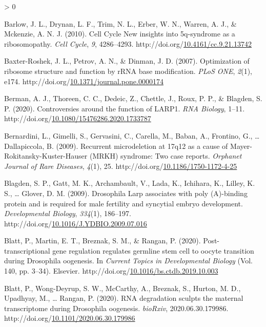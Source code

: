 \documentclass[12pt,oneside]{reedthesis}
\newlength{\cslhangindent}
\newenvironment{CSLReferences}[2] %
 {%
  \setlength{\parindent}{0pt}
  \ifodd #1 \everypar{\setlength{\hangindent}{\cslhangindent}}\ignorespaces\fi
  \ifnum #2 > 0
  \setlength{\parskip}{#2\baselineskip}
  \fi
 }%
 {}
\begin{document}
\begin{CSLReferences}{1}{0}
\leavevmode\hypertarget{ref-Barlow2010a}{}%
Barlow, J. L., Drynan, L. F., Trim, N. L., Erber, W. N., Warren, A. J., \& Mckenzie, A. N. J. (2010). Cell {Cycle New} insights into 5q-syndrome as a ribosomopathy. \emph{Cell Cycle}, \emph{9}, 4286--4293. http://doi.org/\href{https://doi.org/10.4161/cc.9.21.13742}{10.4161/cc.9.21.13742}

\leavevmode\hypertarget{ref-Baxter-Roshek2007f}{}%
Baxter-Roshek, J. L., Petrov, A. N., \& Dinman, J. D. (2007). Optimization of ribosome structure and function by {rRNA} base modification. \emph{PLoS ONE}, \emph{2}(1), e174. http://doi.org/\href{https://doi.org/10.1371/journal.pone.0000174}{10.1371/journal.pone.0000174}

\leavevmode\hypertarget{ref-bermanControversiesFunctionLARP12020}{}%
Berman, A. J., Thoreen, C. C., Dedeic, Z., Chettle, J., Roux, P. P., \& Blagden, S. P. (2020). Controversies around the function of {LARP1}. \emph{RNA Biology}, 1--11. http://doi.org/\href{https://doi.org/10.1080/15476286.2020.1733787}{10.1080/15476286.2020.1733787}

\leavevmode\hypertarget{ref-bernardiniRecurrentMicrodeletion17q122009}{}%
Bernardini, L., Gimelli, S., Gervasini, C., Carella, M., Baban, A., Frontino, G., \ldots{} Dallapiccola, B. (2009). Recurrent microdeletion at 17q12 as a cause of {Mayer-Rokitansky-Kuster-Hauser} ({MRKH}) syndrome: Two case reports. \emph{Orphanet Journal of Rare Diseases}, \emph{4}(1), 25. http://doi.org/\href{https://doi.org/10.1186/1750-1172-4-25}{10.1186/1750-1172-4-25}

\leavevmode\hypertarget{ref-Blagden2009f}{}%
Blagden, S. P., Gatt, M. K., Archambault, V., Lada, K., Ichihara, K., Lilley, K. S., \ldots{} Glover, D. M. (2009). Drosophila {Larp} associates with poly ({A})-binding protein and is required for male fertility and syncytial embryo development. \emph{Developmental Biology}, \emph{334}(1), 186--197. http://doi.org/\href{https://doi.org/10.1016/J.YDBIO.2009.07.016}{10.1016/J.YDBIO.2009.07.016}

\leavevmode\hypertarget{ref-blattPosttranscriptionalGeneRegulation2020}{}%
Blatt, P., Martin, E. T., Breznak, S. M., \& Rangan, P. (2020). Post-transcriptional gene regulation regulates germline stem cell to oocyte transition during {Drosophila} oogenesis. In \emph{Current {Topics} in {Developmental Biology}} (Vol. 140, pp. 3--34). {Elsevier}. http://doi.org/\href{https://doi.org/10.1016/bs.ctdb.2019.10.003}{10.1016/bs.ctdb.2019.10.003}

\leavevmode\hypertarget{ref-blattRNADegradationSculpts2020}{}%
Blatt, P., Wong-Deyrup, S. W., McCarthy, A., Breznak, S., Hurton, M. D., Upadhyay, M., \ldots{} Rangan, P. (2020). {RNA} degradation sculpts the maternal transcriptome during {Drosophila} oogenesis. \emph{bioRxiv}, 2020.06.30.179986. http://doi.org/\href{https://doi.org/10.1101/2020.06.30.179986}{10.1101/2020.06.30.179986}


\end{CSLReferences}
\end{document}
